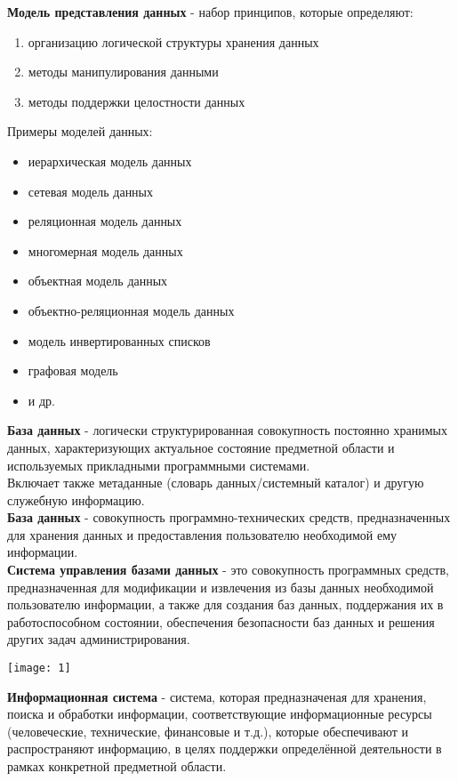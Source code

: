\documentclass[a4paper]{article}
\begin{document}
\textbf{Модель представления данных} - набор принципов, которые определяют:
\begin{enumerate}
        \item организацию логической структуры хранения данных
	\item методы манипулирования данными
	\item методы поддержки целостности данных
\end{enumerate}
Примеры моделей данных:
\begin{itemize}
        \item иерархическая модель данных
	\item сетевая модель данных
	\item реляционная модель данных
	\item многомерная модель данных
	\item объектная модель данных
	\item объектно-реляционная модель данных
	\item модель инвертированных списков
	\item графовая модель
	\item и др.
\end{itemize}
\textbf{База данных} - логически структурированная совокупность постоянно хранимых данных, характеризующих актуальное состояние предметной области и используемых прикладными программными системами.\\
Включает также метаданные (словарь данных/системный каталог) и другую служебную информацию.\\
\textbf{База данных} - совокупность программно-технических средств, предназначенных для хранения данных и предоставления пользователю необходимой ему информации.\\
\textbf{Система управления базами данных} - это совокупность программных средств, предназначенная для модификации и извлечения из базы данных необходимой пользователю информации, а также для создания баз данных, поддержания их в работоспособном состоянии, обеспечения безопасности баз данных и решения других задач администрирования.\\
\begin{center}
	\texttt{[image: 1]}
\end{center}
\textbf{Информационная система} - система, которая предназначеная для хранения, поиска и обработки информации, соответствующие информационные ресурсы (человеческие, технические, финансовые и т.д.), которые обеспечивают и распространяют информацию, в целях поддержки определённой деятельности в рамках конкретной предметной области.\\\\
\end{document}
